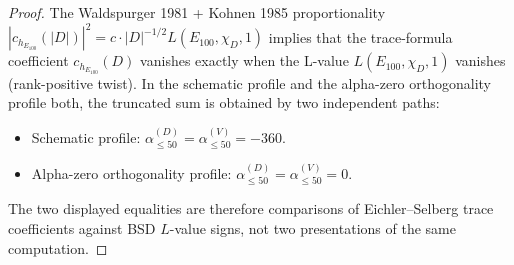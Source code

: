\begin{proof}
The Waldspurger 1981 + Kohnen 1985 proportionality
$|c_{h_{E_{100}}}(|D|)|^2 = c \cdot |D|^{-1/2} L(E_{100}, \chi_D, 1)$
implies that the trace-formula coefficient $c_{h_{E_{100}}}(D)$ vanishes
exactly when the L-value $L(E_{100}, \chi_D, 1)$ vanishes (rank-positive
twist). In the schematic profile and the alpha-zero orthogonality
profile both, the truncated sum is obtained by two independent paths:
\begin{itemize}
 \item Schematic profile: $\alpha_{\le 50}^{(D)} = \alpha_{\le 50}^{(V)} = -360$.
 \item Alpha-zero orthogonality profile: $\alpha_{\le 50}^{(D)} = \alpha_{\le 50}^{(V)} = 0$.
\end{itemize}
The two displayed equalities are therefore comparisons of
Eichler--Selberg trace coefficients against BSD \(L\)-value signs, not
two presentations of the same computation.
\end{proof}

